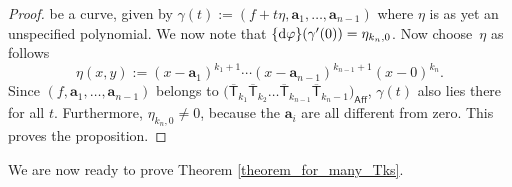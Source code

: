 \begin{proof}
be a curve, given by
$\gamma(t) := (f+t\eta, \mathbf{a}_1, \dots, \mathbf{a}_{n-1})$
where $\eta$ is as yet an unspecified polynomial. We now note that
$\{{\rm d} \varphi\}(\gamma^{\prime}(0)) = \eta_{k_{n}, 0}$. Now choose~$\eta$ as follows
\[ \eta(x, y) := (x-\mathbf{a}_1)^{k_1+1} \cdots (x-\mathbf{a}_{n-1})^{k_{n-1}+1} (x-0)^{k_n}.\]
Since $(f, \mathbf{a}_1, \dots, \mathbf{a}_{n-1})$
belongs to $\bigl(\overline{\mathsf{T}}_{k_1} \overline{\mathsf{T}}_{k_2}
\dots \overline{\mathsf{T}}_{k_{n-1}} \overline{\mathsf{T}}_{k_{n}-1}\bigr)_{\mathsf{Aff}}$,
$\gamma(t)$
also lies there for all $t$.
Furthermore, $\eta_{k_n, 0} \neq 0$, because the $\mathbf{a}_i$ are all different from zero.
This proves the proposition.
\end{proof}

We are now ready to prove Theorem \ref{theorem_for_many_Tks}.

